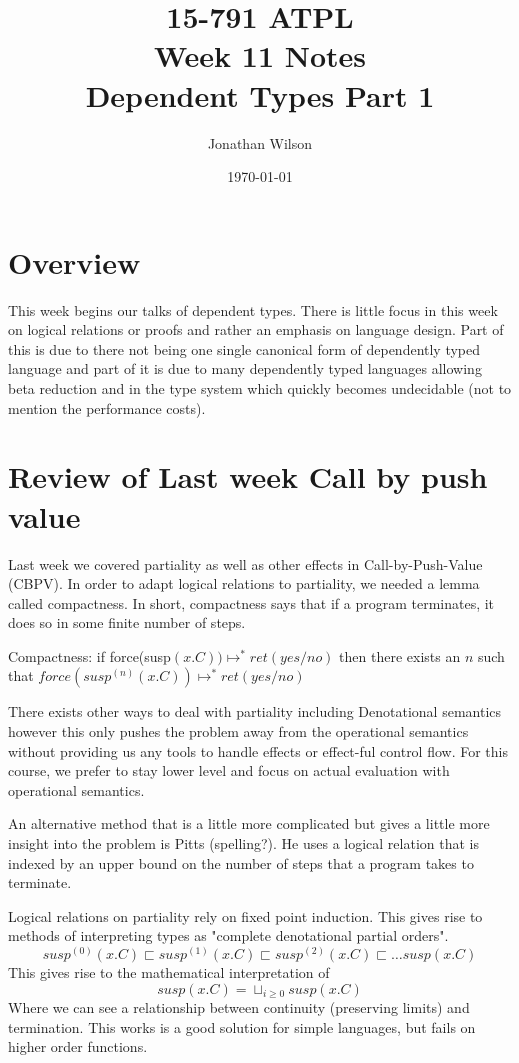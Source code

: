 \documentclass[11pt]{article}
\title{15-791 ATPL \\ Week 11 Notes \\ Dependent Types Part 1}
\author{Jonathan Wilson}
\date{\today}
\begin{document}
\maketitle{}

\section*{Overview}

This week begins our talks of dependent types. There is little focus in this week on logical relations or proofs and rather an emphasis on language design. Part of this is due to there not being one single canonical form of dependently typed language and part of it is due to many dependently typed languages allowing beta reduction and in the type system which quickly becomes undecidable (not to mention the performance costs).

\section*{Review of Last week Call by push value}

Last week we covered partiality as well as other effects in Call-by-Push-Value (CBPV). In order to adapt logical relations to partiality, we needed a lemma called compactness. In short, compactness says that if a program terminates, it does so in some finite number of steps. 

Compactness: if force(susp$(x.C)) \mapsto^* ret(yes / no)$ then there exists an $n$ such that $force(susp^{(n)}(x.C)) \mapsto^* ret(yes / no)$

There exists other ways to deal with partiality including Denotational semantics however this only pushes the problem away from the operational semantics without providing us any tools to handle effects or effect-ful control flow. For this course, we prefer to stay lower level and focus on actual evaluation with operational semantics.

An alternative method that is a little more complicated but gives a little more insight into the problem is Pitts (spelling?). He uses a logical relation that is indexed by an upper bound on the number of steps that a program takes to terminate.

Logical relations on partiality rely on fixed point induction. This gives rise to methods of interpreting types as "complete denotational partial orders".
$$susp^{(0)}(x.C) \sqsubset susp^{(1)}(x.C) \sqsubset susp^{(2)}(x.C) \sqsubset \dots susp(x.C)$$
This gives rise to the mathematical interpretation of 
$$susp(x.C) = \sqcup_{i \ge 0} susp(x.C)$$
Where we can see a relationship between continuity (preserving limits) and termination. This works is a good solution for simple languages, but fails on higher order functions.
\end{document}
